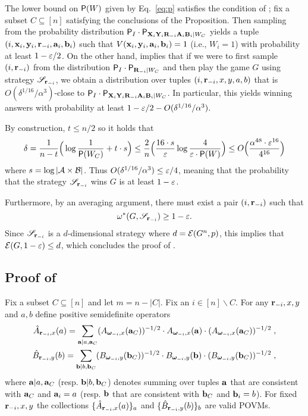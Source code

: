 The lower bound on $\P(W)$ given by Eq.~\eqref{eq:p} satisfies the condition of ; fix a subset $C \subseteq [n]$ satisfying the conclusions of the Proposition. Then sampling from the probability distribution $\P_I \cdot \P_{\bX_i \bY_i \bR_\mi \bA_i \bB_i | W_C}$ yields a tuple $(i,\bx_i,\by_i,\br_\mi,\ba_i,\bb_i)$ such that $V(\bx_i,\by_i,\ba_i,\bb_i) = 1$ (i.e., $W_i = 1$) with probability at least $1 - \eps/2$. On the other hand,  implies that if we were to first sample $(i,\br_\mi)$ from the distribution $\P_I \cdot \P_{\bR_\mi | W_C}$ and then play the game $G$ using strategy $\strategy_{\br_\mi}$, we obtain a distribution over tuples $(i,\br_\mi,x,y,a,b)$ that is $O(\delta^{1/16}/\alpha^3)$-close to $\P_I \cdot \P_{\bX_i \bY_i \bR_\mi \bA_i \bB_i | W_C}$. In particular, this yields winning answers with probability at least $1 - \eps/2 - O(\delta^{1/16}/\alpha^3)$. 

By construction, $t \leq n/2$ so it holds that
\[
\delta = \frac{1}{n-t} \Big( \log \frac{1}{\P(W_C)} + t \cdot s \Big) \leq \frac{2}{n} \Big ( \frac{16 \cdot s}{\eps} \log \frac{4}{\eps \cdot \P(W)} \Big) \leq O \Big( \frac{\alpha^{48} \cdot \eps^{16}}{4^{16}} \Big)
\]
where $s = \log |\A \times \B|$. Thus $O(\delta^{1/16}/\alpha^3) \leq \eps/4$, meaning that the probability that the strategy $\strategy_{\br_\mi}$ wins $G$ is at least $1 - \eps$.

Furthermore, by an averaging argument, there must exist a pair $(i,\br_\mi)$ such that
\[
	\eval(G,\strategy_{\br_\mi}) \geq 1 - \eps.
\]
Since $\strategy_{\br_\mi}$ is a $d$-dimensional strategy where $d = \E(G^n,p)$, this implies that $\E(G,1 - \eps) \leq d$, which concludes the proof of .

\subsection{Proof of }
\label{sec:main-lemma-proof}

Fix a subset $C \subseteq [n]$ and let $m=n-|C|$. Fix an $i\in [n]\backslash C$. For any $\br_\mi,x,y$ and $a,b$ define positive semidefinite operators
\begin{align*}
	\what{A}_{\br_\mi,x}(a) = \sum_{\ba | a, \ba_C} (A_{\bomega_\mi,x}(\ba_C) )^{-1/2} \cdot A_{\bomega_\mi,x}(\ba) \cdot (A_{\bomega_\mi,x}(\ba_C) )^{-1/2} \;,\\
	\what{B}_{\br_\mi, y}(b) = \sum_{\bb | b, \bb_C}  (B_{\bomega_\mi,y}(\bb_C) )^{-1/2} \cdot B_{\bomega_\mi,y}(\bb) \cdot (B_{\bomega_\mi,y}(\bb_C) )^{-1/2}\;,
\end{align*}
where $\ba | a, \ba_C$ (resp. $\bb | b, \bb_C$) denotes summing over tuples $\ba$ that are consistent with $\ba_C$ and $\ba_i = a$ (resp. $\bb$ that are consistent with $\bb_C$ and $\bb_i = b$). For fixed $\br_\mi, x,y$ the collections $\{\what{A}_{\br_\mi, x}(a) \}_{a}$ and $\{\what{B}_{\br_\mi,y}(b)\}_{b}$ are valid POVMs. 

